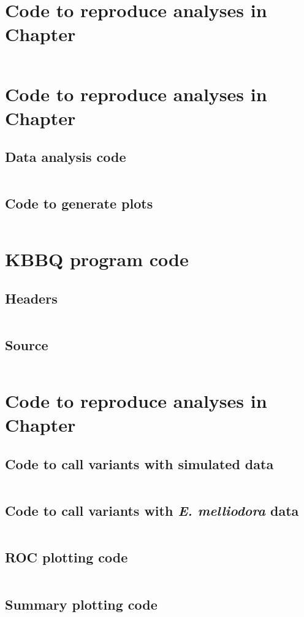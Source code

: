 \chapter{Code to reproduce analyses in Chapter \protect\structuredref{}}
\label{ch:structured_code}
\inputminted[breaklines]{Makefile}{ch3/scripts/ch3_makefiles.txt}

\chapter{Code to reproduce analyses in Chapter \protect\kbbqref{}}
\label{ch:kbbq_plot_code}
\section{Data analysis code}
\inputminted[breaklines]{Makefile}{ch4/scripts/ch4_makefiles.txt}
\section{Code to generate plots}
\inputminted[breaklines]{r}{ch4/scripts/plot_benchmarks.R}

\chapter{KBBQ program code}
\label{ch:kbbq_code}
\section{Headers}
\inputminted[breaklines]{cpp}{ch4/scripts/kbbq_include.hh}
\section{Source}
\inputminted[breaklines]{cpp}{ch4/scripts/kbbq_src.cc}

\chapter{Code to reproduce analyses in Chapter \protect\evaluatingref{}}
\label{ch:evaluating_code}
\section{Code to call variants with simulated data}
\inputminted[breaklines]{Makefile}{ch5/scripts/sim_variants_makefiles.txt}
\section{Code to call variants with \textit{E. melliodora} data}
\inputminted[breaklines]{Makefile}{ch5/scripts/euc_variants_makefiles.txt}
\section{ROC plotting code}
\inputminted[breaklines]{r}{ch5/scripts/roc_plots.R}
\section{Summary plotting code}
\inputminted[breaklines]{r}{ch5/scripts/hapdip_summary_plots.R}

